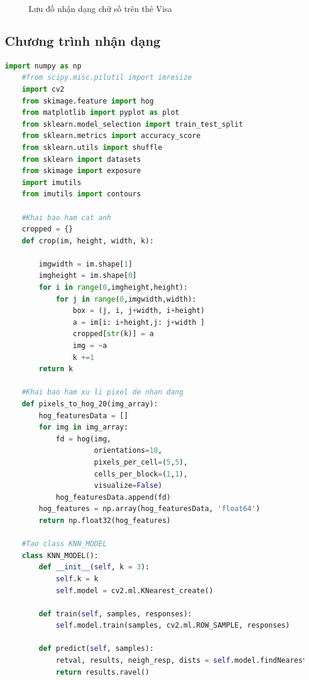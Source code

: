 \begin{figure}[htp]
    \caption{Lưu đồ nhận dạng chữ số trên thẻ Visa}
\end{figure}

\subsection{Chương trình nhận dạng}

\begin{lstlisting}[language=Python, caption=Recognition Visa]
    import numpy as np
    #from scipy.misc.pilutil import imresize
    import cv2 
    from skimage.feature import hog
    from matplotlib import pyplot as plot
    from sklearn.model_selection import train_test_split
    from sklearn.metrics import accuracy_score
    from sklearn.utils import shuffle
    from sklearn import datasets
    from skimage import exposure
    import imutils
    from imutils import contours
    
    #Khai bao ham cat anh
    cropped = {}
    def crop(im, height, width, k):
        
        imgwidth = im.shape[1]
        imgheight = im.shape[0]
        for i in range(0,imgheight,height):
            for j in range(0,imgwidth,width):
                box = (j, i, j+width, i+height)
                a = im[i: i+height,j: j+width ]
                cropped[str(k)] = a
                img = ~a
                k +=1
        return k
    
    #Khai bao ham xu li pixel de nhan dang
    def pixels_to_hog_20(img_array):
        hog_featuresData = []
        for img in img_array:
            fd = hog(img, 
                     orientations=10, 
                     pixels_per_cell=(5,5),
                     cells_per_block=(1,1), 
                     visualize=False)
            hog_featuresData.append(fd)
        hog_features = np.array(hog_featuresData, 'float64')
        return np.float32(hog_features)
    
    #Tao class KNN_MODEL
    class KNN_MODEL():
        def __init__(self, k = 3):
            self.k = k
            self.model = cv2.ml.KNearest_create()
    
        def train(self, samples, responses):
            self.model.train(samples, cv2.ml.ROW_SAMPLE, responses)
    
        def predict(self, samples):
            retval, results, neigh_resp, dists = self.model.findNearest(samples, self.k)
            return results.ravel()
    

\end{lstlisting}
